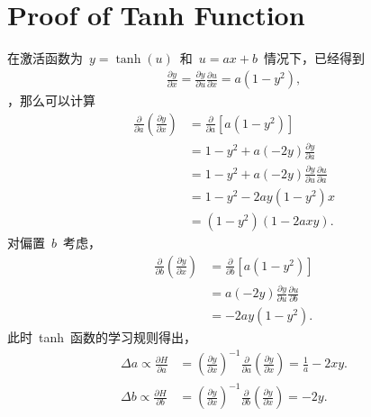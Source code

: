 \documentclass[UTF8,a4paper,12pt]{ctexart}
\numberwithin{equation}{section}
\numberwithin{figure}{section}
\numberwithin{table}{section}
\begin{document}
\section{Proof of Tanh Function} \label{appendix2}
在激活函数为~$y=\tanh(u)$~和~$u=ax+b$~情况下，已经得到
\begin{align}
\frac{\partial y}{\partial x} = \frac{\partial y}{\partial u} \frac{\partial u}{\partial x} = a(1-y^2),
\end{align}
，那么可以计算
\begin{align}
\frac{\partial}{\partial a} \left( \frac{\partial y}{\partial x} \right) &= \frac{\partial}{\partial a} [ a(1-y^2) ] \nonumber \\
&= 1-y^2 + a (-2y)\frac{\partial y}{\partial a} \nonumber \\
&= 1-y^2 + a (-2y) \frac{\partial y}{\partial u} \frac{\partial u}{\partial a} \nonumber \\
&= 1-y^2 - 2ay (1-y^2) x \nonumber \\
&= (1-y^2)(1 - 2axy). 
\end{align}
对偏置~$b$~考虑，
\begin{align}
\frac{\partial}{\partial b} \left( \frac{\partial y}{\partial x} \right) &= \frac{\partial}{\partial b} [ a(1-y^2) ] \nonumber \\
&= a(-2y)\frac{\partial y}{\partial u} \frac{\partial u}{\partial b} \nonumber \\
&= -2ay(1-y^2).
\end{align}
此时~tanh~函数的学习规则得出，
\begin{align}
\Delta a \varpropto \frac{\partial H}{\partial a} &= \left( \frac{\partial y}{\partial x} \right)^{-1} \frac{\partial}{\partial a} \left( \frac{\partial y}{\partial x} \right) = \frac{1}{a} - 2xy. \\
\Delta b \varpropto \frac{\partial H}{\partial b} &= \left( \frac{\partial y}{\partial x} \right)^{-1} \frac{\partial}{\partial b} \left( \frac{\partial y}{\partial x} \right) = -2y.
\end{align}



\end{document}
